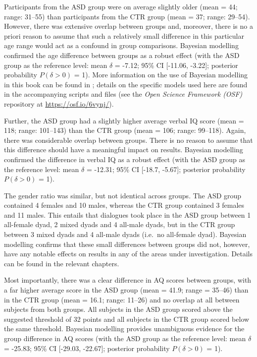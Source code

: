 Participants from the ASD group were on average slightly older (mean = 44; range: 31--55) than participants from the CTR group (mean = 37; range: 29--54). However, there was extensive overlap between groups and, moreover, there is no a priori reason to assume that such a relatively small difference in this particular age range would act as a confound in group comparisons. Bayesian modelling confirmed the age difference between groups as a robust effect (with the ASD group as the reference level: mean \(\delta\) = -7.12; 95\% CI {[}-11.06, -3.22{]}; posterior probability \(P(\delta > 0)\) = 1). More information on the use of Bayesian modelling in this book can be found in ; details on the specific models used here are found in the accompanying scripts and files (see the \emph{Open Science Framework (OSF)} repository at \url{https://osf.io/6vynj/}).

Further, the ASD group had a slightly higher average verbal IQ score (mean = 118; range: 101--143) than the CTR group (mean = 106; range: 99--118). Again, there was considerable overlap between groups. There is no reason to assume that this difference should have a meaningful impact on results. Bayesian modelling confirmed the difference in verbal IQ as a robust effect (with the ASD group as the reference level: mean \(\delta\) = -12.31; 95\% CI {[}-18.7, -5.67{]}; posterior probability \(P(\delta > 0)\) = 1).

The gender ratio was similar, but not identical across groups. The ASD group contained 4 females and 10 males, whereas the CTR group contained 3 females and 11 males. This entails that dialogues took place in the ASD group between 1 all-female dyad, 2 mixed dyads and 4 all-male dyads, but in the CTR group between 3 mixed dyads and 4 all-male dyads (i.e.~no all-female dyad). Bayesian modelling confirms that these small differences between groups did not, however, have any notable effects on results in any of the areas under investigation. Details can be found in the relevant chapters.

Most importantly, there was a clear difference in AQ scores between groups, with a far higher average score in the ASD group (mean = 41.9; range = 35--46) than in the CTR group (mean = 16.1; range: 11--26) and no overlap at all between subjects from both groups. All subjects in the ASD group scored above the suggested threshold of 32 points and all subjects in the CTR group scored below the same threshold. Bayesian modelling provides unambiguous evidence for the group difference in AQ scores (with the ASD group as the reference level: mean \(\delta\) = -25.83; 95\% CI {[}-29.03, -22.67{]}; posterior probability \(P(\delta > 0)\) = 1).

